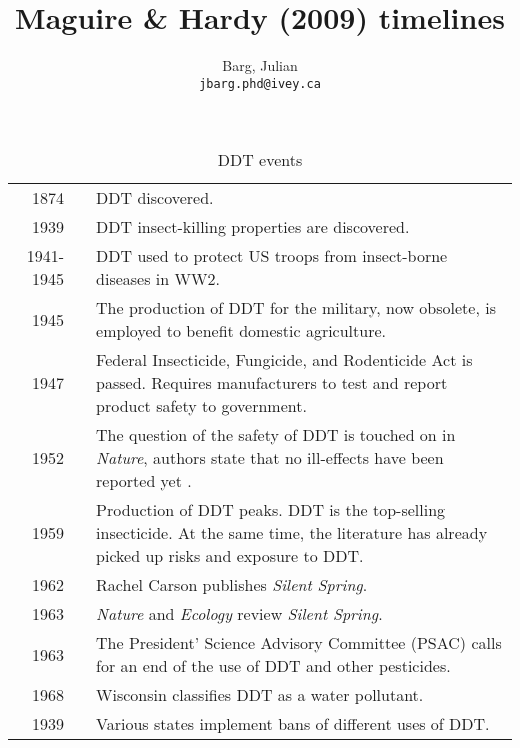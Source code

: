 \documentclass{article}
\title{Maguire \& Hardy (2009) timelines}
\author{
	Barg, Julian\\
	\texttt{jbarg.phd@ivey.ca}
}
\newcommand{\timeline}{\hspace{-2.3pt}$\bullet$ \hspace{5pt}}
\begin{document}
	\maketitle

	\newpage

	\begin{table}[H]
		\caption{DDT events}

		\begin{tabularx}{\textwidth}{r @{\hspace{0.5\tabcolsep}} l |@{\timeline} X}
			\toprule

			1874 & & DDT discovered.\\

			1939 & & DDT insect-killing properties are discovered.\\

			1941-1945 & & DDT used to protect US troops from insect-borne diseases in WW2.\\

			1945 & & The production of DDT for the military, now obsolete, is employed to benefit domestic agriculture.\\

			1947 & & Federal Insecticide, Fungicide, and Rodenticide Act is passed. Requires manufacturers to test and report product safety to government.\\

			1952 & & The question of the safety of DDT is touched on in \textit{Nature}, authors state that no ill-effects have been reported yet \citep{Davidson1952}.\\
	 
			1959 & & Production of DDT peaks. DDT is the top-selling insecticide. At the same time, the literature has already picked up risks and exposure to DDT.\\

			1962 & & Rachel Carson publishes \textit{Silent Spring}.\\

			1963 & & \textit{Nature} and \textit{Ecology} review \textit{Silent Spring}.\\

			1963 & & The President' Science Advisory Committee (PSAC) calls for an end of the use of DDT and other pesticides.\\

			1968 & & Wisconsin classifies DDT as a water pollutant.\\

			1939 & & Various states implement bans of different uses of DDT.\\


\end{tabularx}
\end{table}
\end{document}
